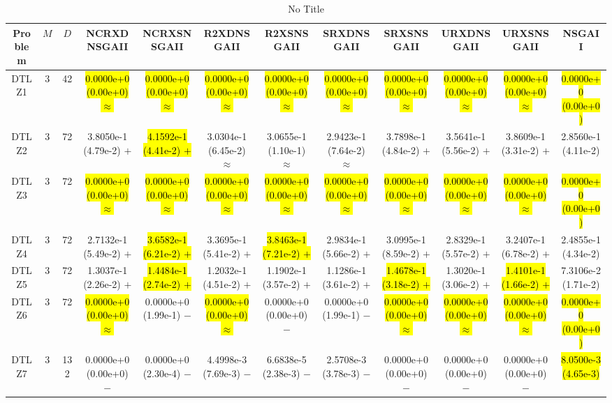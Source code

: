 \documentclass[journal]{IEEEtran}
\begin{document}
\begin{table*}[htbp]
\renewcommand{\arraystretch}{1.2}
\centering
\caption{No Title}
\begin{tabular}{cccccccccccc}
\toprule
Problem&$M$&$D$&NCRXDNSGAII&NCRXSNSGAII&R2XDNSGAII&R2XSNSGAII&SRXDNSGAII&SRXSNSGAII&URXDNSGAII&URXSNSGAII&NSGAII\\
\midrule
\multirow{1}{*}{DTLZ1}&3&42&\hl{0.0000e+0 (0.00e+0) $\approx$}&\hl{0.0000e+0 (0.00e+0) $\approx$}&\hl{0.0000e+0 (0.00e+0) $\approx$}&\hl{0.0000e+0 (0.00e+0) $\approx$}&\hl{0.0000e+0 (0.00e+0) $\approx$}&\hl{0.0000e+0 (0.00e+0) $\approx$}&\hl{0.0000e+0 (0.00e+0) $\approx$}&\hl{0.0000e+0 (0.00e+0) $\approx$}&\hl{0.0000e+0 (0.00e+0)}\\
\hline
\multirow{1}{*}{DTLZ2}&3&72&3.8050e-1 (4.79e-2) $+$&\hl{4.1592e-1 (4.41e-2) $+$}&3.0304e-1 (6.45e-2) $\approx$&3.0655e-1 (1.10e-1) $\approx$&2.9423e-1 (7.64e-2) $\approx$&3.7898e-1 (4.84e-2) $+$&3.5641e-1 (5.56e-2) $+$&3.8609e-1 (3.31e-2) $+$&2.8560e-1 (4.11e-2)\\
\hline
\multirow{1}{*}{DTLZ3}&3&72&\hl{0.0000e+0 (0.00e+0) $\approx$}&\hl{0.0000e+0 (0.00e+0) $\approx$}&\hl{0.0000e+0 (0.00e+0) $\approx$}&\hl{0.0000e+0 (0.00e+0) $\approx$}&\hl{0.0000e+0 (0.00e+0) $\approx$}&\hl{0.0000e+0 (0.00e+0) $\approx$}&\hl{0.0000e+0 (0.00e+0) $\approx$}&\hl{0.0000e+0 (0.00e+0) $\approx$}&\hl{0.0000e+0 (0.00e+0)}\\
\hline
\multirow{1}{*}{DTLZ4}&3&72&2.7132e-1 (5.49e-2) $+$&\hl{3.6582e-1 (6.21e-2) $+$}&3.3695e-1 (5.41e-2) $+$&\hl{3.8463e-1 (7.21e-2) $+$}&2.9834e-1 (5.66e-2) $+$&3.0995e-1 (8.59e-2) $+$&2.8329e-1 (5.57e-2) $+$&3.2407e-1 (6.78e-2) $+$&2.4855e-1 (4.34e-2)\\
\hline
\multirow{1}{*}{DTLZ5}&3&72&1.3037e-1 (2.26e-2) $+$&\hl{1.4484e-1 (2.74e-2) $+$}&1.2032e-1 (4.51e-2) $+$&1.1902e-1 (3.57e-2) $+$&1.1286e-1 (3.61e-2) $+$&\hl{1.4678e-1 (3.18e-2) $+$}&1.3020e-1 (3.06e-2) $+$&\hl{1.4101e-1 (1.66e-2) $+$}&7.3106e-2 (1.71e-2)\\
\hline
\multirow{1}{*}{DTLZ6}&3&72&\hl{0.0000e+0 (0.00e+0) $\approx$}&0.0000e+0 (1.99e-1) $-$&\hl{0.0000e+0 (0.00e+0) $\approx$}&0.0000e+0 (0.00e+0) $-$&0.0000e+0 (1.99e-1) $-$&\hl{0.0000e+0 (0.00e+0) $\approx$}&\hl{0.0000e+0 (0.00e+0) $\approx$}&\hl{0.0000e+0 (0.00e+0) $\approx$}&\hl{0.0000e+0 (0.00e+0)}\\
\hline
\multirow{1}{*}{DTLZ7}&3&132&0.0000e+0 (0.00e+0) $-$&0.0000e+0 (2.30e-4) $-$&4.4998e-3 (7.69e-3) $-$&6.6838e-5 (2.38e-3) $-$&2.5708e-3 (3.78e-3) $-$&0.0000e+0 (0.00e+0) $-$&0.0000e+0 (0.00e+0) $-$&0.0000e+0 (0.00e+0) $-$&\hl{8.0500e-3 (4.65e-3)}\\

\end{tabular}
\end{table*}
\end{document}
